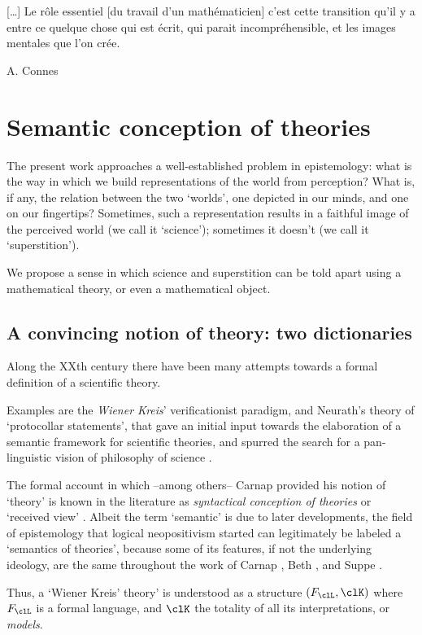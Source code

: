 \epigraph{[\dots\unkern] Le rôle essentiel [du travail d'un mathématicien] c'est cette transition qu'il y a entre ce quelque chose qui est écrit, qui parait incompréhensible, et les images mentales que l'on crée.}{A. Connes}
\section{Semantic conception of theories}\label{sec_1_intro}
The present work approaches a well-established problem in epistemology: what is the way in which we build representations of the world from perception? What is, if any, the relation between the two `worlds', one depicted in our minds, and one on our fingertips? Sometimes, such a representation results in a faithful image of the perceived world (we call it `science'); sometimes it doesn't (we call it `superstition').

We propose a sense in which science and superstition can be told apart using a mathematical theory, or even a mathematical object.
\subsection{A convincing notion of theory: two dictionaries}
Along the XXth century there have been many attempts towards a formal definition of a scientific theory.

Examples are the \emph{Wiener Kreis}' verificationist paradigm, and Neurath's theory of `protocollar statements', that gave an initial input towards the elaboration of a semantic framework for scientific theories, and spurred the search for a pan-linguistic vision of philosophy of science \cite{Weinb}.

The formal account in which --among others-- Carnap \cite{carnapfound} provided his notion of `theory' is known in the literature as \emph{syntactical conception of theories} or `received view' \cite{krause-foundation,krause2011axiomatization,giunti2016}. Albeit the term `semantic' is due to later developments, the field of epistemology that logical neopositivism started can legitimately be labeled a `semantics of theories', because some of its features, if not the underlying ideology, are the same throughout the work of Carnap \cite{carnap56,carnapfound},  Beth \cite{beth1961semantics}, and Suppe \cite{suppe89}.

Thus, a `Wiener Kreis' theory' is understood as a structure $(F_\clL, \clK)$ where $F_\clL$ is a formal language, and $\clK$ the totality of all its interpretations, or \emph{models}.

